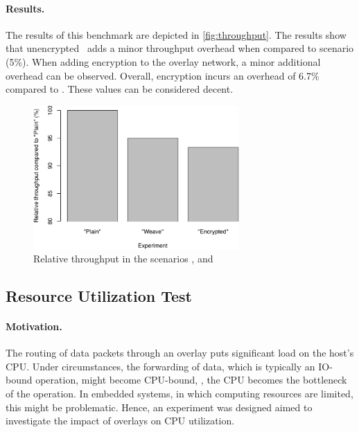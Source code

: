 \paragraph{Results.} The results of this benchmark are depicted in \autoref{fig:throughput}. The results show that unencrypted \wnet\ adds a minor throughput overhead when compared to  scenario (5\%). When adding encryption to the overlay network, a minor additional overhead can be observed. Overall, encryption incurs an overhead of 6.7\% compared to . These values can be considered decent.


\begin{figure}[htpb]
  \centering
  \includegraphics[width=0.7\textwidth]{figures/throughput}
  \caption[Weave throughput benchmark results]{Relative throughput in the scenarios ,  and }\label{fig:throughput}
\end{figure}

%
%
%
%
%
%
%
%
%
%


\subsection{Resource Utilization Test} \label{sec:utilization}

\paragraph{Motivation.} The routing of data packets through an overlay puts significant load on the host's CPU. Under circumstances, the forwarding of data, which is typically an IO-bound operation, might become CPU-bound, \ie , the CPU becomes the bottleneck of the operation. In embedded systems, in which computing resources are limited, this might be problematic. Hence, an experiment was designed aimed to investigate the impact of overlays on CPU utilization.

